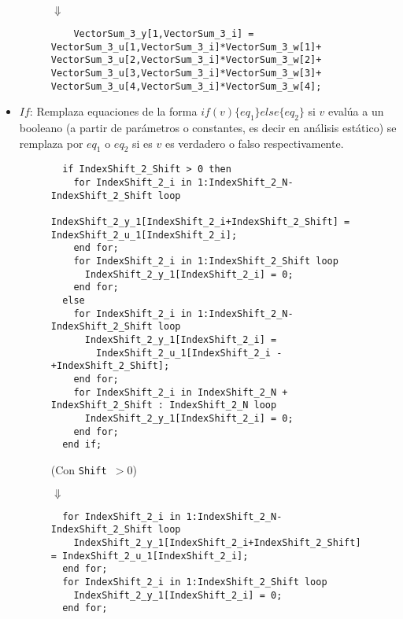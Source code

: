 \begin{itemize}
\begin{figure}[htp]
$\Downarrow$

\begin{tcolorbox}
\begin{verbatim}
    VectorSum_3_y[1,VectorSum_3_i] = VectorSum_3_u[1,VectorSum_3_i]*VectorSum_3_w[1]+ VectorSum_3_u[2,VectorSum_3_i]*VectorSum_3_w[2]+ VectorSum_3_u[3,VectorSum_3_i]*VectorSum_3_w[3]+ VectorSum_3_u[4,VectorSum_3_i]*VectorSum_3_w[4];
\end{verbatim}
\end{tcolorbox}
\end{figure}

\newpage

		\item $If$: Remplaza equaciones de la forma $if(v) \{eq_1\} else \{eq_2\}$ si $v$ evalúa a un booleano (a partir de parámetros o constantes, 
			es decir en análisis estático) se remplaza por $eq_1$ o $eq_2$ si es $v$ es verdadero o falso respectivamente.

\begin{figure}[htp]
\centering
\begin{tcolorbox}
\begin{verbatim}
  if IndexShift_2_Shift > 0 then
    for IndexShift_2_i in 1:IndexShift_2_N-IndexShift_2_Shift loop
      IndexShift_2_y_1[IndexShift_2_i+IndexShift_2_Shift] = IndexShift_2_u_1[IndexShift_2_i];
    end for;
    for IndexShift_2_i in 1:IndexShift_2_Shift loop
      IndexShift_2_y_1[IndexShift_2_i] = 0;
    end for;
  else
    for IndexShift_2_i in 1:IndexShift_2_N-IndexShift_2_Shift loop
      IndexShift_2_y_1[IndexShift_2_i] = 
		IndexShift_2_u_1[IndexShift_2_i - +IndexShift_2_Shift];
    end for;
    for IndexShift_2_i in IndexShift_2_N + IndexShift_2_Shift : IndexShift_2_N loop
      IndexShift_2_y_1[IndexShift_2_i] = 0;
    end for;
  end if;
\end{verbatim}
\end{tcolorbox}

(Con \texttt{Shift $> 0$})

$\Downarrow$

\begin{tcolorbox}
\begin{verbatim}
  for IndexShift_2_i in 1:IndexShift_2_N-IndexShift_2_Shift loop
    IndexShift_2_y_1[IndexShift_2_i+IndexShift_2_Shift] = IndexShift_2_u_1[IndexShift_2_i];
  end for;
  for IndexShift_2_i in 1:IndexShift_2_Shift loop
    IndexShift_2_y_1[IndexShift_2_i] = 0;
  end for;
\end{verbatim}
\end{tcolorbox}
\end{figure}
\end{itemize}
